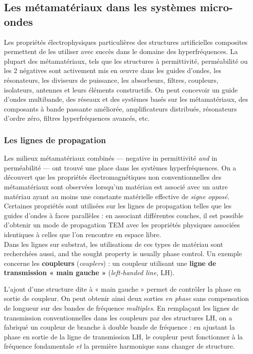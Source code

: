 \subsection{Les métamatériaux dans les systèmes micro-ondes}

Les propriétés électrophysiques particulières des structures artificielles
composites permettent de les utiliser avec succès dans le domaine des
hyperfréquences. La plupart des métamatériaux, tels que les structures à
permittivité, perméabilité ou les 2 négatives sont activement mis en œuvre dans
les guides d'ondes, les résonateurs, les diviseurs de puissance, les
absorbeurs, filtres, coupleurs, isolateurs, antennes et leurs éléments
constructifs. On peut concevoir un guide d'ondes multibande, des réseaux et des
systèmes basés sur les métamatériaux, des composants à bande passante
améliorée, amplificateurs distribués, résonateurs d'ordre zéro, filtres
hyperfréquences avancés, etc.

\subsubsection{Les lignes de propagation}

Les milieux métamatériaux combinés --- negative in permittivité \emph{and} in
perméabilité --- ont trouvé une place dans les systèmes hyperfréquences. On a
découvert que les propriétés électromagnétiques non conventionnelles des
métamatériaux sont observées lorsqu'un matériau est associé avec un autre
matériau ayant au moins une constante matérielle effective de \emph{signe
opposé}.\\

Certaines propriétés sont utilisées sur les lignes de propagation telles que les
guides d'ondes à faces parallèles : en associant différentes couches, il est
possible d'obtenir un mode de propagation TEM avec les propriétés physiques
associées identiques à celles que l'on rencontre en espace libre.\\

Dans les lignes sur substrat, les utilisations de ces types de matériau sont
recherchées aussi, and the sought property is usually phase control. Un exemple
concerne les \textbf{coupleurs} (\textit{couplers}) : un coupleur utilisant une
\textbf{ligne de transmission « main gauche »} (\textit{left-handed line}, LH).

\begin{example}
  L'ajout d'une structure dite à « main gauche » permet de contrôler la phase
  en sortie de coupleur. On peut obtenir ainsi deux sorties \emph{en phase} sans
  compensation de longueur sur des bandes de fréquence \emph{multiples}. En
  remplaçant les lignes de transmission conventionnelles dans les coupleurs par
  des structures LH, on a fabriqué un coupleur de branche à double bande de
  fréquence : en ajustant la phase en sortie de la ligne de transmission LH, le
  coupleur peut fonctionner à la fréquence fondamentale \emph{et} la première
  harmonique sans changer de structure.
\end{example}

